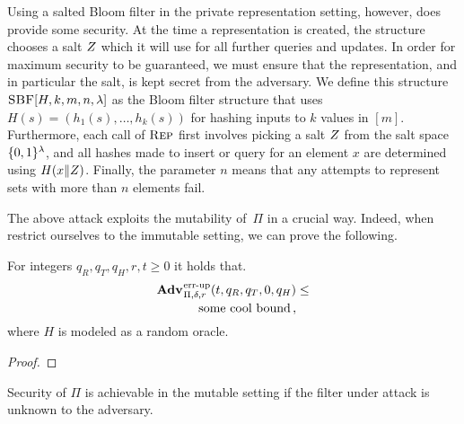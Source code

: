 {Using a salted Bloom filter in the private representation setting, however, does
provide some security. At the time a representation is created, the structure
chooses a salt $Z$ which it will use for all further queries and updates. In
order for maximum security to be guaranteed, we must ensure that the
representation, and in particular the salt, is kept secret from the adversary.
We define this structure $\textnormal{\textsc{SBF}}[H,k,m,n,\lambda]$ as the Bloom filter structure
that uses $H(s) = (h_1(s),\ldots,h_k(s))$ for hashing inputs to $k$ values in
$[m]$. Furthermore, each call of $\textnormal{\textsc{Rep}}$ first involves picking a salt $Z$
from the salt space $\{0,1\}^\lambda$, and all hashes made to insert or query for
an element $x$ are determined using $H(x \Vert Z)$. Finally, the parameter
$n$ means that any attempts to represent sets with more than $n$ elements fail.
}

The above attack exploits the mutability of~$\Pi$ in a crucial way.
%
%
Indeed, when restrict ourselves to the immutable setting, we can prove the
following.
%
\begin{theorem}\label{thm:sbf-errep1}
  For integers $q_R, q_T, q_H, r, t \geq 0$ it holds that.
  \begin{equation*}
    \begin{aligned}
      \Adv{\errep}_{\Pi,\delta,r}(t, q_R,q_T,0,q_H) &\leq \\
      \hspace{20pt}
        \text{some cool bound} \,,
    \end{aligned}
  \end{equation*}
  where $H$ is modeled as a random oracle.
\end{theorem}
\begin{proof}
  
\end{proof}

Security of $\Pi$ is achievable in the mutable setting if the filter under
attack is unknown to the adversary.
%


